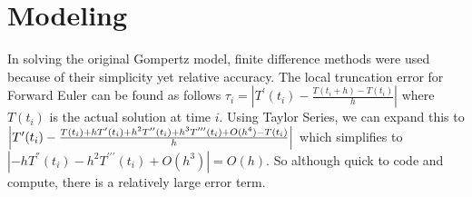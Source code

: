 \documentclass[11pt]{amsart}
\begin{document}



\section{Modeling}

In solving the original Gompertz model, finite difference methods were used because of their simplicity yet relative accuracy. The local truncation error for Forward Euler can be found as follows $\tau_i = |T^\prime(t_i) - \frac{T(t_i + h) - T(t_i)}{h}|$  where $T(t_i)$ is the actual solution at time $i$. Using Taylor Series, we can expand this to $\Bigl |T^\prime(t_i) - \frac{T(t_i) + hT^\prime(t_i) + h^2T^{\prime\prime}(t_i) + h^3T^{\prime\prime\prime}(t_i) + O(h^4) - T(t_i)}{h}\Bigr |$ which simplifies to $|-hT^\dprime(t_i) - h^2T^{\prime \prime \prime}(t_i) + O(h^3)| = O(h)$. So although quick to code and compute, there is a relatively large error term. 
\end{document}
